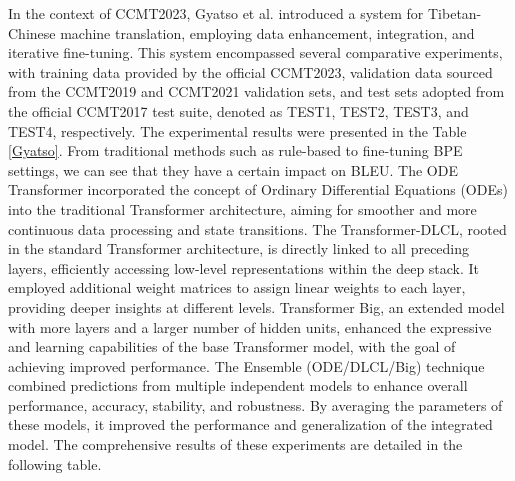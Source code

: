 \documentclass[acmsmall]{acmart}
\begin{document}
\color{red}
In the context of CCMT2023, Gyatso et al. \cite{gyatso2023ccmt2023} introduced a system for Tibetan-Chinese machine translation, employing data enhancement, integration, and iterative fine-tuning. This system encompassed several comparative experiments, with training data provided by the official CCMT2023, validation data sourced from the CCMT2019 and CCMT2021 validation sets, and test sets adopted from the official CCMT2017 test suite, denoted as TEST1, TEST2, TEST3, and TEST4, respectively. The experimental results were presented in the Table \ref{Gyatso}. From traditional methods such as rule-based to fine-tuning BPE settings, we can see that they have a certain impact on BLEU. The ODE Transformer incorporated the concept of Ordinary Differential Equations (ODEs) into the traditional Transformer architecture, aiming for smoother and more continuous data processing and state transitions. The Transformer-DLCL, rooted in the standard Transformer architecture, is directly linked to all preceding layers, efficiently accessing low-level representations within the deep stack. It employed additional weight matrices to assign linear weights to each layer, providing deeper insights at different levels. Transformer Big, an extended model with more layers and a larger number of hidden units, enhanced the expressive and learning capabilities of the base Transformer model, with the goal of achieving improved performance. The Ensemble (ODE/DLCL/Big) technique combined predictions from multiple independent models to enhance overall performance, accuracy, stability, and robustness. By averaging the parameters of these models, it improved the performance and generalization of the integrated model. The comprehensive results of these experiments are detailed in the following table.
\color{black}
\end{document}
